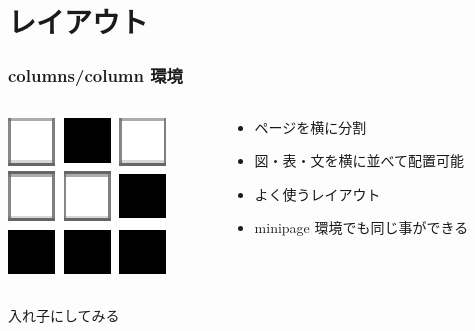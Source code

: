 \documentclass[dvipdfmx,cjk,xcolor=dvipsnames,envcountsect,notheorems,12pt]{beamer}
\theoremstyle{definition}
\begin{document}
\section{レイアウト}

\begin{frame}
  \frametitle{columns/column 環境}
  \begin{columns}%
    \begin{column}{0.2\textwidth}%
      \begin{center}
        \includegraphics{sample-image.eps}
      \end{center}
    \end{column}
    \begin{column}{0.8\textwidth}
      \begin{itemize}
      \item ページを横に分割
      \item 図・表・文を横に並べて配置可能
      \item よく使うレイアウト
      \item minipage 環境でも同じ事ができる
      \end{itemize}
    \end{column}
  \end{columns}
  \pause\vfill
  \begin{columns}%
    \begin{column}{0.4\textwidth}
      \begin{center}
        入れ子にしてみる
      \end{center}
      \begin{columns}
        \begin{column}{0.33\textwidth}

\end{column}
\end{columns}
\end{column}
\end{columns}
\end{frame}
\end{document}
